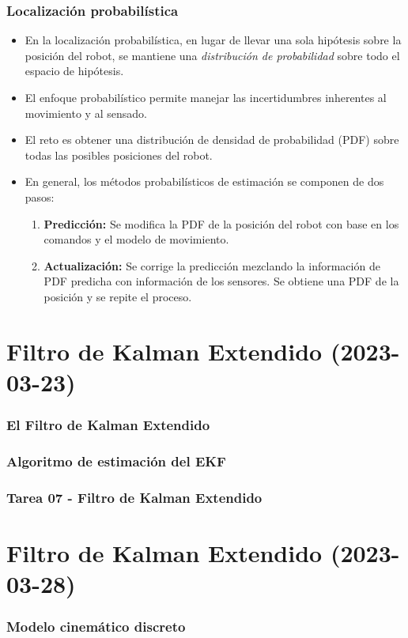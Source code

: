 \begin{frame}\frametitle{Localización probabilística}
  \begin{itemize}
  \item En la localización probabilística, en lugar de llevar una sola hipótesis sobre la posición del robot, se mantiene una \textit{distribución de probabilidad} sobre todo el espacio de hipótesis.
  \item El enfoque probabilístico permite manejar las incertidumbres inherentes al movimiento y al sensado.
  \item El reto es obtener una distribución de densidad de probabilidad (PDF) sobre todas las posibles posiciones del robot.
  \item En general, los métodos probabilísticos de estimación se componen de dos pasos:
    \begin{enumerate}
    \item \textbf{Predicción:} Se modifica la PDF de la posición del robot con base en los comandos y el modelo de movimiento.
    \item \textbf{Actualización:} Se corrige la predicción mezclando la información de PDF predicha con información de los sensores. Se obtiene una PDF de la posición y se repite el proceso. 
    \end{enumerate}
  \end{itemize}
  
\end{frame}

\section{Filtro de Kalman Extendido (2023-03-23)}
\begin{frame}\frametitle{El Filtro de Kalman Extendido}
\end{frame}

\begin{frame}\frametitle{Algoritmo de estimación del EKF}
\end{frame}

\begin{frame}\frametitle{Tarea 07 - Filtro de Kalman Extendido}
\end{frame}

\section{Filtro de Kalman Extendido (2023-03-28)}
\begin{frame}\frametitle{Modelo cinemático discreto}
\end{frame}

